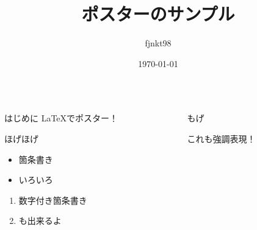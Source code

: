 \documentclass[dvipdfmx, final, t]{beamer}
\title{ポスターのサンプル}
\author{fjnkt98}
\institute{NITIC}
\date{\today}
\begin{document}
\begin{frame}
  \begin{columns}[t]
    \begin{column}{.45\linewidth}
      \begin{block}{はじめに}
        \LaTeX でポスター！
      \end{block}

      \begin{block}{ほげほげ}
        \begin{itemize}
          \item 箇条書き
          \item いろいろ
        \end{itemize}

        \begin{enumerate}
          \item 数字付き箇条書き
          \item も出来るよ
        \end{enumerate}
      \end{block}
    \end{column}

    \begin{column}{.45\linewidth}
      \begin{block}{もげ}

        \alert{これも強調表現！}
      \end{block}
    \end{column}
  \end{columns}
\end{frame}
\end{document}
